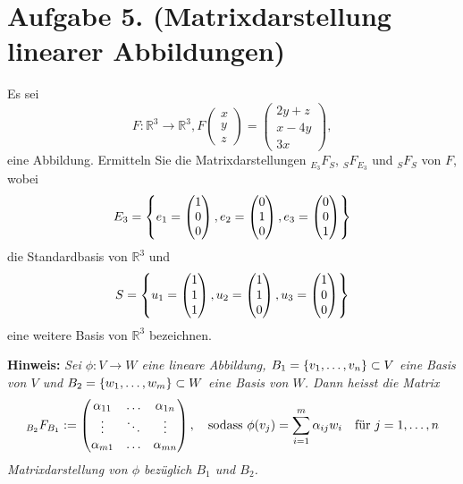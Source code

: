 \documentclass[german,12pt]{homework}
\newcommand{\RR}{\mathbb{R}}
\DeclarePairedDelimiter{\enbrace}{(}{)}
\DeclarePairedDelimiter{\penbrace}{\{}{\}}
\begin{document}
    \section*{Aufgabe 5. (Matrixdarstellung linearer Abbildungen)}

    \begin{problem}
        Es sei
        \[F: \RR^3 \to \RR^3, F\begin{pmatrix}x\\y\\z\end{pmatrix} = \begin{pmatrix}
            2y + z\\
            x - 4y\\
            3x
        \end{pmatrix},\]
        eine Abbildung. Ermitteln Sie die Matrixdarstellungen \(_{E_3}F_S\), \(_SF_{E_3}\) und \(_SF_S\) von \(F\), wobei
        \[E_3 = \penbrace*{e_1 = \begin{pmatrix}1\\0\\0\end{pmatrix}, e_2 = \begin{pmatrix}0\\1\\0\end{pmatrix}, e_3 = \begin{pmatrix}0\\0\\1\end{pmatrix}}\]
        die Standardbasis von \(\RR^3\) und
        \[S = \penbrace*{u_1 = \begin{pmatrix}1\\1\\1\end{pmatrix}, u_2 = \begin{pmatrix}1\\1\\0\end{pmatrix}, u_3 = \begin{pmatrix}1\\0\\0\end{pmatrix}}\]
        eine weitere Basis von \(\RR^3\) bezeichnen.

        \textbf{Hinweis:} \emph{Sei \(\phi: V \to W\) eine lineare Abbildung, \(B_1 = \penbrace*{v_1, \ldots, v_n} \subset V\) eine Basis von \(V\) und \(B_2 = \penbrace*{w_1, \ldots, w_m} \subset W\) eine Basis von \(W\). Dann heisst die Matrix
        \[_{B_2}F_{B_1} := \begin{pmatrix}
            \alpha_{11} & \ldots & \alpha_{1n}\\
            \vdots & \ddots & \vdots\\
            \alpha_{m1} & \ldots & \alpha_{mn}
        \end{pmatrix}, \quad \text{sodass }\phi\enbrace*{v_j} = \sum_{i = 1}^m\alpha_{ij}w_i \quad \text{für }j = 1, \ldots, n\]
        Matrixdarstellung von \(\phi\) bezüglich \(B_1\) und \(B_2\).}
    \end{problem}
\end{document}
